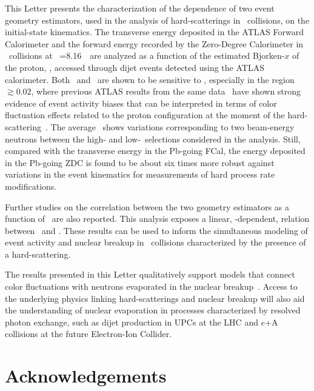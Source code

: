 \documentclass[PAPER, atlasdraft=false, USenglish, cernpreprint]{atlasdoc}
\begin{document}
This Letter presents the characterization of the dependence of two event geometry estimators, used in the analysis of hard-scatterings in \pxPb\ collisions, on the initial-state kinematics. The transverse energy deposited in the ATLAS Forward Calorimeter and the forward energy recorded by the Zero-Degree Calorimeter in \pxPb\ collisions at \SNN~=8.16~\TeV\ are analyzed as a function of the estimated Bjorken-$x$ of the proton, \xp, accessed through dijet events detected using the ATLAS calorimeter.
Both \EZDC\ and \ETPB\ are shown to be sensitive to \xp, especially in the region \xp~$\gtrsim 0.02$, where previous ATLAS results from the same data~\cite{ATLAS:2023zfx} have shown strong evidence of event activity biases that can be interpreted in terms of color fluctuation effects related to the proton configuration at the moment of the hard-scattering~\cite{Alvioli:2017wou}. 
The average \EZDC\ shows variations corresponding to two beam-energy neutrons between the high- and low-\xp\ selections considered in the analysis. 
Still, compared with the transverse energy in the Pb-going FCal, the energy deposited in the Pb-going ZDC is found to be about six times more robust against variations in the event kinematics for measurements of hard process rate modifications. 


Further studies on the correlation between the two geometry estimators as a function of \xp\ are also reported. This analysis exposes a linear, \xp-dependent, relation between \ETPB\ and \EZDC.
These results can be used to inform the simultaneous modeling of event activity and nuclear breakup in \pxPb\ collisions characterized by the presence of a hard-scattering. 


The results presented in this Letter qualitatively support models that connect color fluctuations with neutrons evaporated in the nuclear breakup~\cite{Alvioli:2024cmd, Alvioli:2025ggv}. Access to the underlying physics linking hard-scatterings and nuclear breakup will also aid the understanding of nuclear evaporation in processes characterized by resolved photon exchange, such as dijet production in UPCs at the LHC and $e$+A collisions at the future Electron-Ion Collider. 


 

\section*{Acknowledgements}
\end{document}

